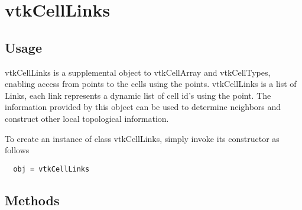 \section{vtkCellLinks}

\subsection{Usage}

 vtkCellLinks is a supplemental object to vtkCellArray and vtkCellTypes, 
 enabling access from points to the cells using the points. vtkCellLinks is
 a list of Links, each link represents a dynamic list of cell id's using the 
 point. The information provided by this object can be used to determine 
 neighbors and construct other local topological information.

To create an instance of class vtkCellLinks, simply
invoke its constructor as follows
\begin{verbatim}
  obj = vtkCellLinks
\end{verbatim}
\subsection{Methods}

